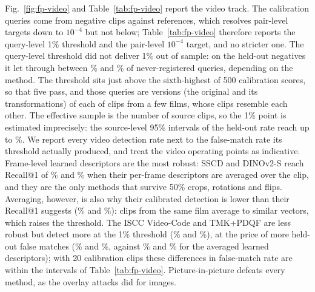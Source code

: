 Fig.~\ref{fig:fp-video} and Table~\ref{tab:fp-video} report the video track. The  calibration queries come from  negative clips against  references, which resolves pair-level targets down to $10^{-4}$ but not below; Table~\ref{tab:fp-video} therefore reports the query-level 1\% threshold and the pair-level $10^{-4}$ target, and no stricter one. The query-level threshold did not deliver 1\% out of sample: on the held-out negatives it let through between \% and \% of never-registered queries, depending on the method. The threshold sits just above the sixth-highest of 500 calibration scores, so that five pass, and those queries are  versions (the original and its transformations) of each of  clips from a few films, whose clips resemble each other. The effective sample is the number of source clips, so the 1\% point is estimated imprecisely: the source-level 95\% intervals of the held-out rate reach up to \%. We report every video detection rate next to the false-match rate its threshold actually produced, and treat the video operating points as indicative. Frame-level learned descriptors are the most robust: SSCD and DINOv2-S reach Recall@1 of \% and \% when their per-frame descriptors are averaged over the clip, and they are the only methods that survive 50\% crops, rotations and flips. Averaging, however, is also why their calibrated detection is lower than their Recall@1 suggests (\% and \%): clips from the same film average to similar vectors, which raises the threshold. The ISCC Video-Code and TMK+PDQF are less robust but detect more at the 1\% threshold (\% and \%), at the price of more held-out false matches (\% and \%, against \% and \% for the averaged learned descriptors); with 20 calibration clips these differences in false-match rate are within the intervals of Table~\ref{tab:fp-video}. Picture-in-picture defeats every method, as the overlay attacks did for images.

